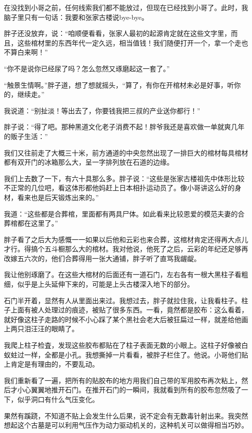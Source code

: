 在没找到小哥之前，任何线索我们都不能放过，但现在已经找到小哥了。此时，我脑子里只有一句话：我要和张家古楼说bye-bye。

胖子还没放弃，说：“咱顺便看看，张家人最初的起源肯定就在这些文字里，而且，这些棺材里的东西年代一定久远，相当值钱！我们随便打开一个，拿一个走也不算白来啊！”

“你不是说你已经尿了吗？怎么忽然又琢磨起这一套了。”

“触景生情啊。”胖子道，想了想就摇头，“算了，有你在开棺材未必是好事，听你的，继续走。”

我说道：“别扯淡！等出去了，你要钱我把三叔的产业送你都行！”

胖子说：“得了吧。那种黑道文化老子消费不起！胖爷我还是喜欢做一单就爽几年的贩子生活：”

我们又往前走了大概三十米，前方通道的中央忽然出现了一排巨大的棺材每具棺材都有双开门的冰箱那么大，呈一字排列放在石道的边缘。

我们上去数了一下，有六十具那么多。胖子说：“这些是张家古楼祖先中体形比较不正常的几位吧，看这体形都他妈赶上日本相扑运动员了。像小哥讲这么好的身材，看来也是后天锻炼出来的。”

我道：“这些都是合葬棺，里面都有两具尸体。如此看来比较恩爱的模范夫妻的合葬棺都在这里了。”

胖子看了之后大为感慨一一如果以后他和云彩也来合葬，这棺材肯定还得再大点儿才行。得搞个五斗橱那么大的棺材。我对他说，他死了之后，云彩的年纪还足够再改嫁五六次的，他们合葬得用一张大通铺，胖子听了直骂我龌龊。

我让他别琢磨了。在这些大棺材的后面还有一道石门，左右各有一根大黑柱子看粗细，似乎是上头延伸下来的，可能是上头古楼深入地下的部分。

石门半开着，显然有人从里面出来过。我想过去，胖子就拉住我，让我看柱子。柱子上面有被人处理过的痕迹，被贴了很多东西。一看，竟然都是胶布：这么看着，就好像这柱子走路的时候不小心踩了某个黑社会老大后被狂扁过一样，就差给他画上两只泪汪汪的眼睛了。

我爬上柱子检査，发现这些胶布都贴在了柱子表面无数的小眼上。这柱子好像被白蚁蛀过一样，全都是小孔。我想撕掉一片看看，被胖子栏住了。他说。小哥他们贴上肯定是有理由的，不要乱动。

我们重新看了一遍，把所有的贴胶布的地方用我们自己带的军用胶布再次粘上，然后才小心翼翼地推开石门。在推开石门的一瞬间，我就看到所有的胶布忽然吸了一下，似乎洞口有什么气压变化。

果然有蹊跷，不知道不贴上会发生什么后果，说不定会有无数毒针射出来。我突然想起这个古墓是可以利用气压作为动力驱动机关的，这种机关可以做得相当巧妙。

